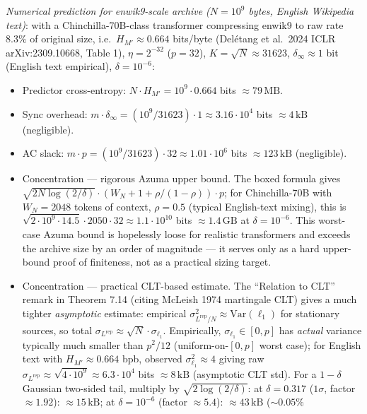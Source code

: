 \documentclass[
]{article}
\begin{document}
\emph{Numerical prediction for enwik9-scale archive
($N = 10^9$ bytes, English Wikipedia text)}: with a
Chinchilla-70B-class transformer compressing enwik9 to raw rate $8.3\%$
of original size, i.e.\ $H_{M'} \approx 0.664$ bits/byte (Del{\'e}tang
et al.\ 2024 ICLR arXiv:2309.10668, Table 1), $\eta = 2^{-32}$
($p = 32$), $K = \sqrt{N} \approx 31623$, $\delta_\infty \approx 1$ bit
(English text empirical), $\delta = 10^{-6}$:
\begin{itemize}
\item Predictor cross-entropy: $N \cdot H_{M'} = 10^9 \cdot 0.664$ bits
$\approx 79 \,\mathrm{MB}$.
\item Sync overhead: $m \cdot \delta_\infty = (10^9 / 31623) \cdot 1
\approx 3.16 \cdot 10^4$ bits $\approx 4 \,\mathrm{kB}$ (negligible).
\item AC slack: $m \cdot p = (10^9 / 31623) \cdot 32 \approx 1.01 \cdot
10^6$ bits $\approx 123 \,\mathrm{kB}$ (negligible).
\item Concentration --- rigorous Azuma upper bound. The boxed formula
gives $\sqrt{2N \log(2/\delta)} \cdot (W_N + 1 + \rho/(1-\rho)) \cdot p$;
for Chinchilla-70B with $W_N = 2048$ tokens of context, $\rho = 0.5$
(typical English-text mixing), this is $\sqrt{2 \cdot 10^9 \cdot 14.5}
\cdot 2050 \cdot 32 \approx 1.1 \cdot 10^{10}$ bits $\approx 1.4
\,\mathrm{GB}$ at $\delta = 10^{-6}$. This worst-case Azuma bound is
hopelessly loose for realistic transformers and exceeds the archive
size by an order of magnitude --- it serves only as a hard upper-
bound proof of finiteness, not as a practical sizing target.
\item Concentration --- practical CLT-based estimate. The
``Relation to CLT'' remark in Theorem 7.14 (citing McLeish 1974 martingale
CLT) gives a much tighter \emph{asymptotic} estimate: empirical
$\sigma^2_{L^{\mathrm{rep}}/N} \approx \mathrm{Var}(\ell_1)$ for stationary
sources, so total $\sigma_{L^{\mathrm{rep}}} \approx \sqrt{N} \cdot
\sigma_{\ell_1}$. Empirically, $\sigma_{\ell_1} \in [0, p]$ has
\emph{actual} variance typically much smaller than $p^2/12$
(uniform-on-$[0,p]$ worst case); for English text with
$H_{M'} \approx 0.664$ bpb, observed $\sigma_{\ell_1}^2 \approx 4$
giving raw $\sigma_{L^{\mathrm{rep}}} \approx \sqrt{4 \cdot 10^9} \approx
6.3 \cdot 10^4$ bits $\approx 8\,\mathrm{kB}$ (asymptotic CLT std).
For a $1-\delta$ Gaussian two-sided tail, multiply by
$\sqrt{2 \log(2/\delta)}$: at $\delta = 0.317$ ($1\sigma$, factor
$\approx 1.92$): $\approx 15\,\mathrm{kB}$; at $\delta = 10^{-6}$
(factor $\approx 5.4$): $\approx 43\,\mathrm{kB}$ ($\sim 0.05\%$

\end{itemize}
\end{document}
